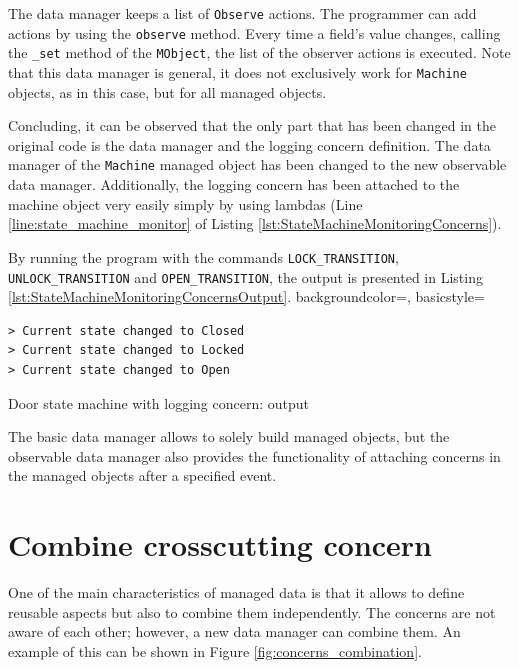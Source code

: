 The data manager keeps a list of \texttt{Observe} actions.
The programmer can add actions by using the \texttt{observe} method.
Every time a field's value changes, calling the \texttt{\_set} method of the \texttt{MObject}, the list of the observer actions is executed.
Note that this data manager is general, it does not exclusively work for \texttt{Machine} objects, as in this case, but for all managed objects.

Concluding, it can be observed that the only part that has been changed in the original code is the data manager and the logging concern definition.
The data manager of the \texttt{Machine} managed object has been changed to the new observable data manager.
Additionally, the logging concern has been attached to the machine object very easily simply by using lambdas (Line \ref{line:state_machine_monitor} of Listing \ref{lst:StateMachineMonitoringConcerns}).

By running the program with the commands \texttt{LOCK\_TRANSITION}, \texttt{UNLOCK\_TRANSITION} and \texttt{OPEN\_TRANSITION}, the output is presented in Listing \ref{lst:StateMachineMonitoringConcernsOutput}.
 {
    backgroundcolor=\color{white},
    basicstyle=\scriptsize\color{black}\ttfamily
}

\begin{sourcecode} [H]
	\lstset{numbers=none}
	\begin{lstlisting}[style=Bash]
> Current state changed to Closed
> Current state changed to Locked
> Current state changed to Open
	\end{lstlisting}
	\caption{Door state machine with logging concern: output}
	\label{lst:StateMachineMonitoringConcernsOutput}
\end{sourcecode}

The basic data manager allows to solely build managed objects, but the observable data manager also provides the functionality of attaching concerns in the managed objects after a specified event.

\section{Combine crosscutting concern}
One of the main characteristics of managed data is that it allows to define reusable aspects but also to combine them independently.
The concerns are not aware of each other; however, a new data manager can combine them.
An example of this can be shown in Figure \ref{fig:concerns_combination}.

